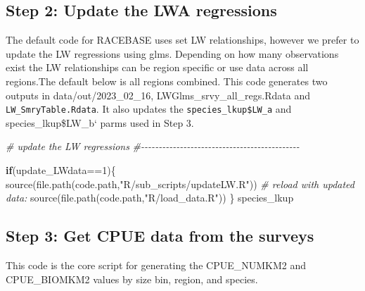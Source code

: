 \documentclass[
]{article}
\newenvironment{Shaded}{\begin{snugshade}}{\end{snugshade}}
\newcommand{\CommentTok}[1]{\textcolor[rgb]{0.56,0.35,0.01}{\textit{#1}}}
\newcommand{\ControlFlowTok}[1]{\textcolor[rgb]{0.13,0.29,0.53}{\textbf{#1}}}
\newcommand{\DecValTok}[1]{\textcolor[rgb]{0.00,0.00,0.81}{#1}}
\newcommand{\FunctionTok}[1]{\textcolor[rgb]{0.00,0.00,0.00}{#1}}
\newcommand{\NormalTok}[1]{#1}
\newcommand{\SpecialCharTok}[1]{\textcolor[rgb]{0.00,0.00,0.00}{#1}}
\newcommand{\StringTok}[1]{\textcolor[rgb]{0.31,0.60,0.02}{#1}}
\begin{document}
\hypertarget{step-2-update-the-lwa-regressions}{%
\subsection{Step 2: Update the LWA
regressions}\label{step-2-update-the-lwa-regressions}}

The default code for RACEBASE uses set LW relationships, however we
prefer to update the LW regressions using glms. Depending on how many
observations exist the LW relationships can be region specific or use
data across all regions.The default below is all regions combined. This
code generates two outputs in data/out/2023\_02\_16,
LWGlms\_srvy\_all\_regs.Rdata and \texttt{LW\_SmryTable.Rdata}. It also
updates the \texttt{species\_lkup\$LW\_a} and species\_lkup\$LW\_b`
parms used in Step 3.

\begin{Shaded}
\begin{Highlighting}[]
  \CommentTok{\# update the LW regressions }
  \CommentTok{\#{-}{-}{-}{-}{-}{-}{-}{-}{-}{-}{-}{-}{-}{-}{-}{-}{-}{-}{-}{-}{-}{-}{-}{-}{-}{-}{-}{-}{-}{-}{-}{-}{-}{-}{-}{-}{-}{-}{-}{-}{-}{-}{-}{-}{-}  }

  \ControlFlowTok{if}\NormalTok{(update\_LWdata}\SpecialCharTok{==}\DecValTok{1}\NormalTok{)\{     }
     \FunctionTok{source}\NormalTok{(}\FunctionTok{file.path}\NormalTok{(code.path,}\StringTok{"R/sub\_scripts/updateLW.R"}\NormalTok{))}
     \CommentTok{\# reload with updated data:}
     \FunctionTok{source}\NormalTok{(}\FunctionTok{file.path}\NormalTok{(code.path,}\StringTok{"R/load\_data.R"}\NormalTok{))}
\NormalTok{  \}}
\NormalTok{  species\_lkup}
\end{Highlighting}
\end{Shaded}

\hypertarget{step-3-get-cpue-data-from-the-surveys}{%
\subsection{Step 3: Get CPUE data from the
surveys}\label{step-3-get-cpue-data-from-the-surveys}}

This code is the core script for generating the CPUE\_NUMKM2 and
CPUE\_BIOMKM2 values by size bin, region, and species.
\end{document}
